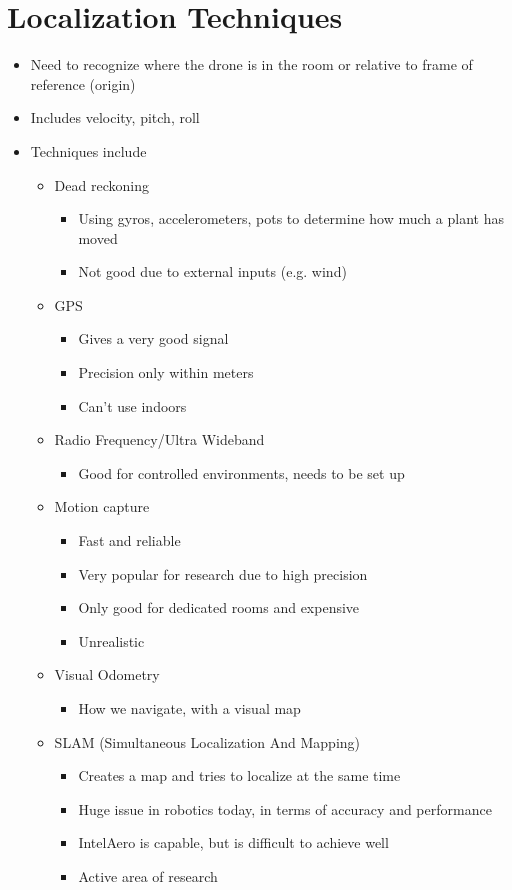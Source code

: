 \documentclass{article}
\begin{document}
\section*{Localization Techniques}
\begin{itemize}
\item Need to recognize where the drone is in the room or relative to frame of reference (origin)
\item  Includes velocity, pitch, roll
\item Techniques include
\begin{itemize}
\item Dead reckoning
\begin{itemize}
\item Using gyros, accelerometers, pots to determine how much a plant has moved
\item Not good due to external inputs (e.g. wind)
\end{itemize}
\item GPS
\begin{itemize}
\item Gives a very good signal
\item Precision only within meters
\item Can't use indoors
\end{itemize}
\item Radio Frequency/Ultra Wideband
\begin{itemize}
\item Good for controlled environments, needs to be set up
\end{itemize}
\item Motion capture
\begin{itemize}
\item Fast and reliable
\item Very popular for research due to high precision
\item Only good for dedicated rooms and expensive
\item Unrealistic
\end{itemize}
\item Visual Odometry
\begin{itemize}
\item How we navigate, with a visual map
\end{itemize}
\item SLAM (Simultaneous Localization And Mapping)
\begin{itemize}
\item Creates a map and tries to localize at the same time
\item Huge issue in robotics today, in terms of accuracy and performance
\item IntelAero is capable, but is difficult to achieve well
\item  Active area of research
\end{itemize}
\end{itemize}
\end{itemize}
\end{document}
